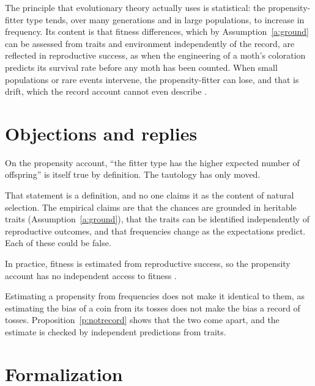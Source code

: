 \documentclass{situationist-preprint}
\begin{document}
The principle that evolutionary theory actually uses is statistical: the propensity-fitter type tends, over many generations and in large populations, to increase in frequency. Its content is that fitness differences, which by Assumption~\ref{a:ground} can be assessed from traits and environment independently of the record, are reflected in reproductive success, as when the engineering of a moth's coloration predicts its survival rate before any moth has been counted. When small populations or rare events intervene, the propensity-fitter can lose, and that is drift, which the record account cannot even describe \citep{Sober1984}.

\section{Objections and replies}

\begin{objection}
On the propensity account, \enquote{the fitter type has the higher expected number of offspring} is itself true by definition. The tautology has only moved.
\end{objection}

\begin{reply}
That statement is a definition, and no one claims it as the content of natural selection. The empirical claims are that the chances are grounded in heritable traits (Assumption~\ref{a:ground}), that the traits can be identified independently of reproductive outcomes, and that frequencies change as the expectations predict. Each of these could be false.
\end{reply}

\begin{objection}[Measurement]
In practice, fitness is estimated from reproductive success, so the propensity account has no independent access to fitness \citep{MatthenAriew2002}.
\end{objection}

\begin{reply}
Estimating a propensity from frequencies does not make it identical to them, as estimating the bias of a coin from its tosses does not make the bias a record of tosses. Proposition~\ref{p:notrecord} shows that the two come apart, and the estimate is checked by independent predictions from traits.
\end{reply}

\section{Formalization}
\end{document}
